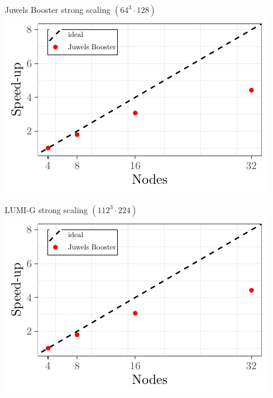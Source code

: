 \documentclass[a0,portrait]{a0poster}
\begin{document}
\begin{multicols}{2}
    \begin{minipage}{0.5\linewidth}
      \centering
      Juwels Booster strong scaling $(64^3 \cdot 128)$\\
      \includegraphics[width=0.80\linewidth,page=1]{data/tmLQCD_scaling/HMC_Scaling}\\
    \end{minipage}
    \begin{minipage}{0.5\linewidth}
      \centering
      LUMI-G strong scaling $(112^3 \cdot 224)$\\
      \includegraphics[width=0.80\linewidth,page=2]{data/tmLQCD_scaling/HMC_Scaling}\\
    \end{minipage}
    
    





\end{multicols}
\end{document}

